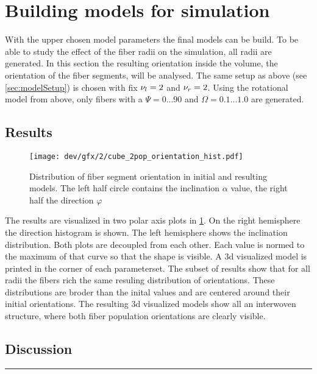 \section{Building models for simulation}
% 
With the upper chosen model parameters the final models can be build.
To be able to study the effect of the fiber radii on the simulation, all radii are generated.
In this section the resulting orientation inside the volume, \ie{} the orientation of the fiber segments, will be analysed.
The same setup as above (see \cref{sec:modelSetup}) is chosen with fix $\textnormal{$\nu_{l}$}=\SI{2}{}$ and $\textnormal{$\nu_{r}$} = \SI{2}{}$.
Using the rotational model from above, only fibers with a $\Psi =  0...90$ and $\Omega = 0.1...1.0$ are generated.
% 
\subsection{Results}
% 
\begin{figure}[!t]
\centering
\texttt{[image: dev/gfx/2/cube\_2pop\_orientation\_hist.pdf]}
\caption[Model histograms]{Distribution of fiber segment orientation in initial and resulting models. The left half circle contains the inclination $\alpha$ value, the right half the direction $\varphi$}
\label{fig:modelOrientation}
\end{figure}
% 
The results are visualized in two polar axis plots in \cref{fig:modelOrientation}. On the right hemisphere the direction histogram is shown.
The left hemisphere shows the inclination distribution.
Both plots are decoupled from each other. 
Each value is normed to the maximum of that curve so that the shape is visible.
A 3d visualized model is printed in the corner of each parameterset.
% 
The subset of results show that for all radii the fibers rich the same resuling distribution of orientations. 
These distributions are broder than the inital values and are centered around their initial orientations.
The resulting 3d visualized models show all an interwoven structure, where both fiber population orientations are clearly visible.
%  
\subsection{Discussion}
% 
\vspace{5pt}
\hrule
\vspace{6pt}
% 